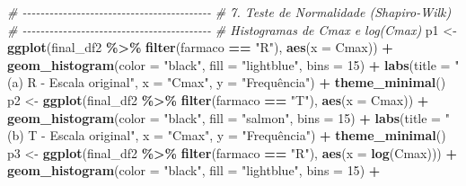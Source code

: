 \documentclass[
]{article}
\newenvironment{Shaded}{\begin{snugshade}}{\end{snugshade}}
\newcommand{\AttributeTok}[1]{\textcolor[rgb]{0.13,0.29,0.53}{#1}}
\newcommand{\CommentTok}[1]{\textcolor[rgb]{0.56,0.35,0.01}{\textit{#1}}}
\newcommand{\DecValTok}[1]{\textcolor[rgb]{0.00,0.00,0.81}{#1}}
\newcommand{\FunctionTok}[1]{\textcolor[rgb]{0.13,0.29,0.53}{\textbf{#1}}}
\newcommand{\NormalTok}[1]{#1}
\newcommand{\OtherTok}[1]{\textcolor[rgb]{0.56,0.35,0.01}{#1}}
\newcommand{\SpecialCharTok}[1]{\textcolor[rgb]{0.81,0.36,0.00}{\textbf{#1}}}
\newcommand{\StringTok}[1]{\textcolor[rgb]{0.31,0.60,0.02}{#1}}
\begin{document}
\begin{Shaded}
\begin{Highlighting}[]
\CommentTok{\# {-}{-}{-}{-}{-}{-}{-}{-}{-}{-}{-}{-}{-}{-}{-}{-}{-}{-}{-}{-}{-}{-}{-}{-}{-}{-}{-}{-}{-}{-}{-}{-}{-}{-}{-}{-}{-}{-}{-}{-}{-}{-}}
\CommentTok{\# 7. Teste de Normalidade (Shapiro{-}Wilk)}
\CommentTok{\# {-}{-}{-}{-}{-}{-}{-}{-}{-}{-}{-}{-}{-}{-}{-}{-}{-}{-}{-}{-}{-}{-}{-}{-}{-}{-}{-}{-}{-}{-}{-}{-}{-}{-}{-}{-}{-}{-}{-}{-}{-}{-}}
\CommentTok{\# Histogramas de Cmax e log(Cmax)}
\NormalTok{p1 }\OtherTok{\textless{}{-}} \FunctionTok{ggplot}\NormalTok{(final\_df2 }\SpecialCharTok{\%\textgreater{}\%} \FunctionTok{filter}\NormalTok{(farmaco }\SpecialCharTok{==} \StringTok{"R"}\NormalTok{), }\FunctionTok{aes}\NormalTok{(}\AttributeTok{x =}\NormalTok{ Cmax)) }\SpecialCharTok{+}
  \FunctionTok{geom\_histogram}\NormalTok{(}\AttributeTok{color =} \StringTok{"black"}\NormalTok{, }\AttributeTok{fill =} \StringTok{"lightblue"}\NormalTok{, }\AttributeTok{bins =} \DecValTok{15}\NormalTok{) }\SpecialCharTok{+}
  \FunctionTok{labs}\NormalTok{(}\AttributeTok{title =} \StringTok{"(a) R {-} Escala original"}\NormalTok{, }\AttributeTok{x =} \StringTok{"Cmax"}\NormalTok{, }\AttributeTok{y =} \StringTok{"Frequência"}\NormalTok{) }\SpecialCharTok{+}
  \FunctionTok{theme\_minimal}\NormalTok{()}
\NormalTok{p2 }\OtherTok{\textless{}{-}} \FunctionTok{ggplot}\NormalTok{(final\_df2 }\SpecialCharTok{\%\textgreater{}\%} \FunctionTok{filter}\NormalTok{(farmaco }\SpecialCharTok{==} \StringTok{"T"}\NormalTok{), }\FunctionTok{aes}\NormalTok{(}\AttributeTok{x =}\NormalTok{ Cmax)) }\SpecialCharTok{+}
  \FunctionTok{geom\_histogram}\NormalTok{(}\AttributeTok{color =} \StringTok{"black"}\NormalTok{, }\AttributeTok{fill =} \StringTok{"salmon"}\NormalTok{, }\AttributeTok{bins =} \DecValTok{15}\NormalTok{) }\SpecialCharTok{+}
  \FunctionTok{labs}\NormalTok{(}\AttributeTok{title =} \StringTok{"(b) T {-} Escala original"}\NormalTok{, }\AttributeTok{x =} \StringTok{"Cmax"}\NormalTok{, }\AttributeTok{y =} \StringTok{"Frequência"}\NormalTok{) }\SpecialCharTok{+}
  \FunctionTok{theme\_minimal}\NormalTok{()}
\NormalTok{p3 }\OtherTok{\textless{}{-}} \FunctionTok{ggplot}\NormalTok{(final\_df2 }\SpecialCharTok{\%\textgreater{}\%} \FunctionTok{filter}\NormalTok{(farmaco }\SpecialCharTok{==} \StringTok{"R"}\NormalTok{), }\FunctionTok{aes}\NormalTok{(}\AttributeTok{x =} \FunctionTok{log}\NormalTok{(Cmax))) }\SpecialCharTok{+}
  \FunctionTok{geom\_histogram}\NormalTok{(}\AttributeTok{color =} \StringTok{"black"}\NormalTok{, }\AttributeTok{fill =} \StringTok{"lightblue"}\NormalTok{, }\AttributeTok{bins =} \DecValTok{15}\NormalTok{) }\SpecialCharTok{+}

\end{Highlighting}
\end{Shaded}
\end{document}
